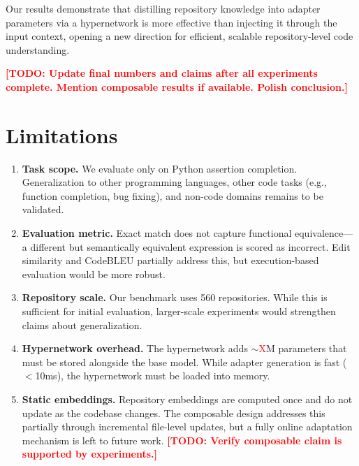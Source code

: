 \documentclass[11pt]{article}
\newcommand{\todo}[1]{\textcolor{red}{\textbf{[TODO: #1]}}}
\newcommand{\todoinline}[1]{\textcolor{red}{#1}}
\begin{document}
Our results demonstrate that distilling repository knowledge into adapter parameters via a hypernetwork is more effective than injecting it through the input context, opening a new direction for efficient, scalable repository-level code understanding.

\todo{Update final numbers and claims after all experiments complete. Mention composable results if available. Polish conclusion.}

\section*{Limitations}

\begin{enumerate}[nosep]
    \item \textbf{Task scope.} We evaluate only on Python assertion completion. Generalization to other programming languages, other code tasks (e.g., function completion, bug fixing), and non-code domains remains to be validated.

    \item \textbf{Evaluation metric.} Exact match does not capture functional equivalence---a different but semantically equivalent expression is scored as incorrect. Edit similarity and CodeBLEU partially address this, but execution-based evaluation would be more robust.

    \item \textbf{Repository scale.} Our benchmark uses 560 repositories. While this is sufficient for initial evaluation, larger-scale experiments would strengthen claims about generalization.

    \item \textbf{Hypernetwork overhead.} The hypernetwork adds $\sim$\todoinline{X}M parameters that must be stored alongside the base model. While adapter generation is fast ($<$10ms), the hypernetwork must be loaded into memory.

    \item \textbf{Static embeddings.} Repository embeddings are computed once and do not update as the codebase changes. The composable design addresses this partially through incremental file-level updates, but a fully online adaptation mechanism is left to future work.
    \todo{Verify composable claim is supported by experiments.}
\end{enumerate}
\end{document}
